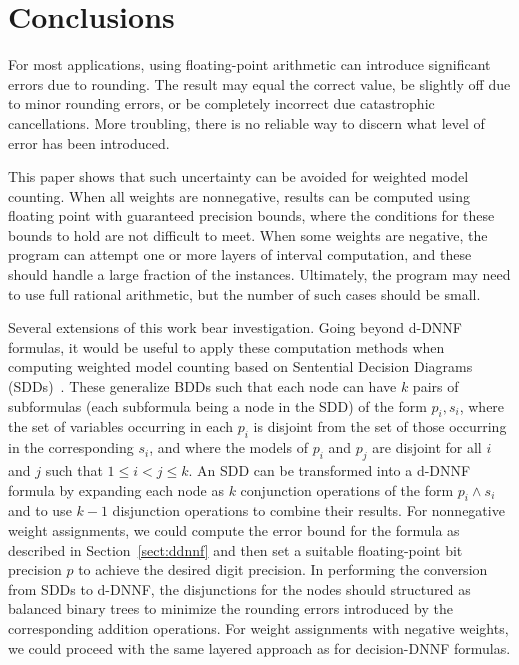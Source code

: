 \documentclass[letterpaper,USenglish,cleveref, autoref, thm-restate]{lipics-v2021}
\begin{document}
\section{Conclusions}
\label{sect:conclusion}

For most applications, using floating-point arithmetic can introduce
significant errors due to rounding.  The result may equal the correct
value, be slightly off due to minor rounding errors, or be completely
incorrect due catastrophic cancellations.  More troubling, there is no
reliable way to discern what level of error has been introduced.

This
paper shows that such uncertainty can be avoided for weighted model
counting.  When all weights are nonnegative, results can be computed
using floating point with guaranteed precision bounds, where the
conditions for these bounds to hold are not difficult to meet.  When some weights
are negative, the program can attempt one or more layers of interval
computation, and these should handle a large fraction of the instances.  Ultimately,
the program may need to use full rational arithmetic, but the number
of such cases should be small.

Several extensions of this work bear investigation.  Going beyond
d-DNNF formulas, it would be useful to apply these computation methods when computing weighted model counting based on 
Sentential Decision Diagrams (SDDs)~\cite{darwiche:ijcai:2011}.  These
generalize BDDs such that each node can have $k$ pairs of subformulas
(each subformula being a node in the SDD) of the form $p_i, s_i$,
where the set of variables occurring in each $p_i$ is disjoint from  the set of those
occurring in the corresponding $s_i$, and where the models of $p_i$ and
$p_j$ are disjoint for all $i$ and $j$ such that $1 \leq i < j \leq
k$.  An SDD can be transformed into a d-DNNF formula by expanding each
node as $k$ conjunction operations of the form $p_i \land s_i$ and to
use $k-1$ disjunction operations to combine their results.  For nonnegative
weight assignments, we could compute the error bound for the formula
as described in Section~\ref{sect:ddnnf} and then set a suitable
floating-point bit precision $p$ to achieve the desired digit precision.  In performing the
conversion from SDDs to d-DNNF, the disjunctions for the nodes should
structured as balanced binary trees to minimize the rounding errors
introduced by the corresponding addition operations.  For weight
assignments with negative weights, we could proceed with the same
layered approach as for decision-DNNF formulas.
\end{document}
